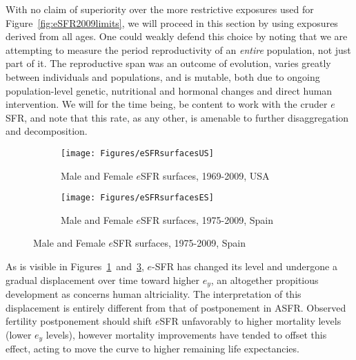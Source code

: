 With no claim of superiority over the more
restrictive exposures used for Figure~\ref{fig:eSFR2009limits}, we will proceed
in this section by using exposures derived from all ages. One could weakly
defend this choice by noting that we are attempting to measure the period
reproductivity of an \textit{entire} population, not just part of it. The
reproductive span was an outcome of evolution, varies greatly between
individuals and populations, and is mutable, both due to ongoing
population-level genetic, nutritional and hormonal changes and direct human
intervention. We will for the time being, be content to work with the cruder $e$SFR, and note
that this rate, as any other, is amenable to further disaggregation and
decomposition.

\begin{figure}
        \centering
        \begin{subfigure}
                \centering
                \caption{Male and Female $e$SFR surfaces, 1969-2009, USA}
                \texttt{[image: Figures/eSFRsurfacesUS]}
                \label{fig:exSFRsurfUS}
        \end{subfigure}
        \begin{subfigure}
                \centering
                \caption{Male and Female $e$SFR surfaces, 1975-2009, Spain}
                \texttt{[image: Figures/eSFRsurfacesES]} 
                \label{fig:exSFRsurfES}
        \end{subfigure}
\end{figure}

As is visible in Figures~\ref{fig:exSFRsurfUS}~and~\ref{fig:exSFRsurfES}, 
$e$-SFR has changed its level and undergone a gradual displacement over 
time toward higher $e_y$, an altogether propitious development
as concerns human altriciality. The interpretation of this displacement is
entirely different from that of postponement in ASFR. Observed fertility 
postponement should shift $e$SFR unfavorably to higher mortality 
levels (lower $e_y$ levels), however mortality improvements have tended to 
offset this effect, acting to move the curve to higher
remaining life expectancies. 

 \FloatBarrier